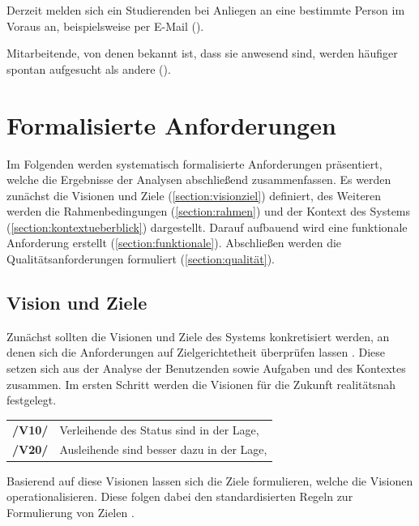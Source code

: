 Derzeit melden sich ein Studierenden bei Anliegen an eine bestimmte
Person im Voraus an, beispielsweise per E-Mail ().

Mitarbeitende, von denen bekannt ist, dass sie anwesend sind,
werden häufiger spontan aufgesucht als andere ().


\section{Formalisierte Anforderungen}
\label{section:anforderung}

Im Folgenden werden systematisch formalisierte Anforderungen präsentiert, welche
die Ergebnisse der Analysen abschließend zusammenfassen. Es werden zunächst die
Visionen und Ziele (\ref{section:visionziel}) definiert, des Weiteren werden die
Rahmenbedingungen (\ref{section:rahmen}) und der Kontext des Systems
(\ref{section:kontextueberblick}) dargestellt. Darauf aufbauend wird eine
funktionale Anforderung erstellt (\ref{section:funktionale}). Abschließen werden
die Qualitätsanforderungen formuliert (\ref{section:qualität}).


\subsection*{Vision und Ziele}
\label{section:visionziel}
Zunächst sollten die Visionen und Ziele des Systems konkretisiert werden, an
denen sich die Anforderungen auf Zielgerichtetheit überprüfen lassen
\cite{balzert2009}. Diese setzen sich aus der Analyse der Benutzenden sowie
Aufgaben und des Kontextes zusammen. Im ersten Schritt werden die Visionen für
die Zukunft realitätsnah festgelegt.



\begin{center}
        \renewcommand{\arraystretch}{1.5}
        \begin{tabular}{p{}p{}}
                \hline
                \textbf{/V10/} & Verleihende des Status sind in der Lage,  \\
                \textbf{/V20/} & Ausleihende sind besser dazu in der Lage, \\
                \hline
        \end{tabular}
\end{center}

Basierend auf diese Visionen lassen sich die Ziele formulieren, welche die
Visionen operationalisieren. Diese folgen dabei den standardisierten Regeln zur
Formulierung von Zielen \cite{pohl_requirements_2008}.


